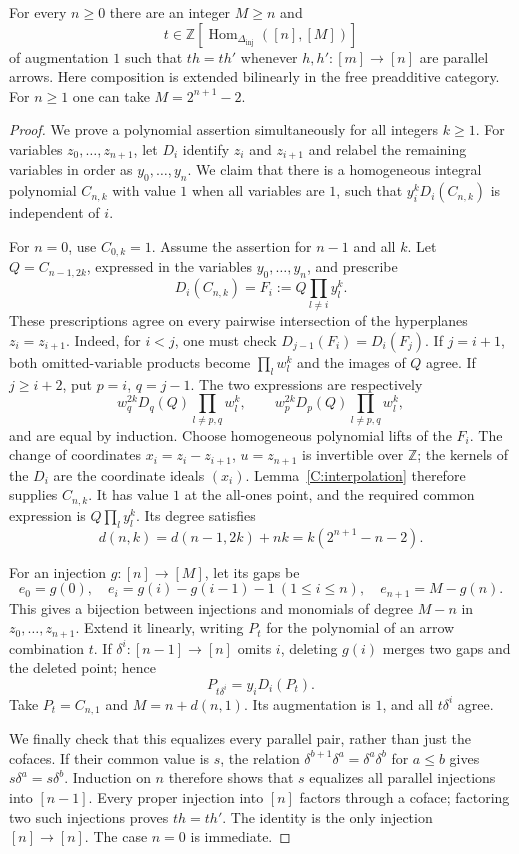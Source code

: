 \begin{lemma}\label{C:affine-cones}
For every $n\geq0$ there are an integer $M\geq n$ and
\[
 t\in\mathbb Z[\operatorname{Hom}_{\Delta_{\mathrm{inj}}}([n],[M])]
\]
of augmentation $1$ such that $th=th'$ whenever $h,h':[m]\to[n]$ are parallel arrows. Here composition is extended bilinearly in the free preadditive category. For $n\geq1$ one can take $M=2^{n+1}-2$.
\end{lemma}
\begin{proof}
We prove a polynomial assertion simultaneously for all integers $k\geq1$. For variables $z_0,\ldots,z_{n+1}$, let $D_i$ identify $z_i$ and $z_{i+1}$ and relabel the remaining variables in order as $y_0,\ldots,y_n$. We claim that there is a homogeneous integral polynomial $C_{n,k}$ with value $1$ when all variables are $1$, such that $y_i^kD_i(C_{n,k})$ is independent of $i$.

For $n=0$, use $C_{0,k}=1$. Assume the assertion for $n-1$ and all $k$. Let $Q=C_{n-1,2k}$, expressed in the variables $y_0,\ldots,y_n$, and prescribe
\[
 D_i(C_{n,k})=F_i:=Q\prod_{l\ne i}y_l^k.
\]
These prescriptions agree on every pairwise intersection of the hyperplanes $z_i=z_{i+1}$. Indeed, for $i<j$, one must check $D_{j-1}(F_i)=D_i(F_j)$. If $j=i+1$, both omitted-variable products become $\prod_lw_l^k$ and the images of $Q$ agree. If $j\geq i+2$, put $p=i$, $q=j-1$. The two expressions are respectively
\[
 w_q^{2k}D_q(Q)\prod_{l\ne p,q}w_l^k,
 \qquad
 w_p^{2k}D_p(Q)\prod_{l\ne p,q}w_l^k,
\]
and are equal by induction. Choose homogeneous polynomial lifts of the $F_i$. The change of coordinates
$x_i=z_i-z_{i+1}$, $u=z_{n+1}$ is invertible over $\mathbb Z$; the kernels of the $D_i$ are the coordinate ideals $(x_i)$. Lemma~\ref{C:interpolation} therefore supplies $C_{n,k}$. It has value $1$ at the all-ones point, and the required common expression is $Q\prod_l y_l^k$. Its degree satisfies
\[
 d(n,k)=d(n-1,2k)+nk=k(2^{n+1}-n-2).
\]

For an injection $g:[n]\to[M]$, let its gaps be
\[
 e_0=g(0),\quad e_i=g(i)-g(i-1)-1\ (1\leq i\leq n),
 \quad e_{n+1}=M-g(n).
\]
This gives a bijection between injections and monomials of degree $M-n$ in $z_0,\ldots,z_{n+1}$. Extend it linearly, writing $P_t$ for the polynomial of an arrow combination $t$. If $\delta^i:[n-1]\to[n]$ omits $i$, deleting $g(i)$ merges two gaps and the deleted point; hence
\[
 P_{t\delta^i}=y_iD_i(P_t).
\]
Take $P_t=C_{n,1}$ and $M=n+d(n,1)$. Its augmentation is $1$, and all $t\delta^i$ agree.

We finally check that this equalizes every parallel pair, rather than just the cofaces. If their common value is $s$, the relation
$\delta^{b+1}\delta^a=\delta^a\delta^b$ for $a\leq b$ gives $s\delta^a=s\delta^b$. Induction on $n$ therefore shows that $s$ equalizes all parallel injections into $[n-1]$. Every proper injection into $[n]$ factors through a coface; factoring two such injections proves $th=th'$. The identity is the only injection $[n]\to[n]$. The case $n=0$ is immediate.
\end{proof}

